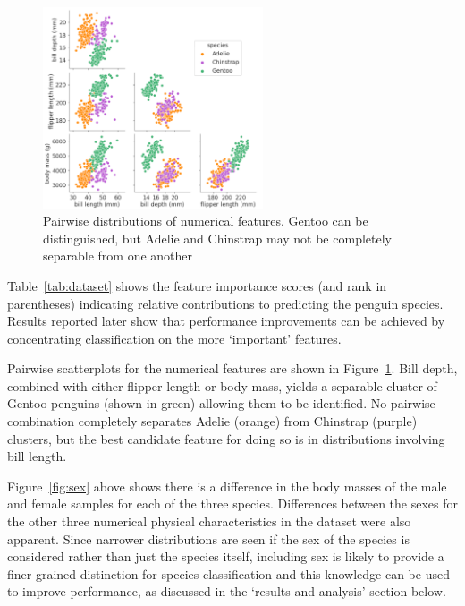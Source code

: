 \documentclass[a4paper, 11pt]{article}
\begin{document}
\begin{figure} %
  \centering
  \vspace{0\baselineskip} %
  \includegraphics[width=0.58\textwidth]{pairwise.png} %
  \vspace{-1.5\baselineskip} %
  \caption{\centering\linespread{0.8}\selectfont Pairwise distributions of numerical features. Gentoo can be distinguished, 
  but Adelie and Chinstrap may not be completely separable from one another}
  \vspace{-1\baselineskip} %
  \label{fig:pairwise}
\end{figure}
Table~\ref{tab:dataset} shows the feature importance scores (and rank in parentheses) indicating
relative contributions to predicting the penguin species.
Results reported later show that performance improvements can be achieved by
concentrating classification on the more `important' features.

Pairwise scatterplots for the numerical features are shown in Figure~\ref{fig:pairwise}. 
Bill depth, combined with either flipper length or body mass, 
yields a separable cluster of Gentoo penguins (shown in 
green) allowing them to be identified. 
No pairwise combination completely separates Adelie (orange) from Chinstrap (purple) clusters, 
but the best candidate feature for doing so is in distributions involving bill length.

Figure~\ref{fig:sex} above shows there is a difference in the body masses of the male and female samples for each of the three species. 
Differences between the sexes for the other three numerical physical characteristics in the dataset were also apparent. 
Since narrower distributions are seen if the sex of the species is considered rather than just the species itself, 
including sex is likely to provide a finer grained distinction for species classification 
and this knowledge can be used to improve performance, as discussed in the `results and analysis' section below. 
\end{document}
